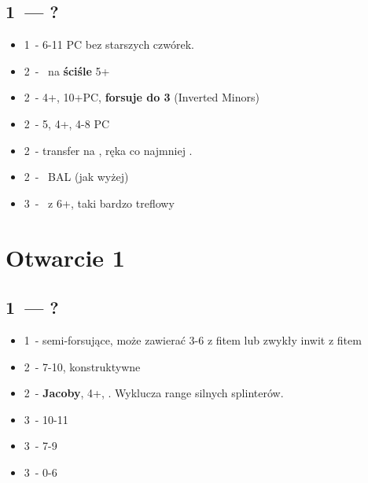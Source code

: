 \documentclass[12pt, a4paper]{article}
\begin{document}
\subsection{1\diams\ --- ?}
\begin{itemize}
    \item 1\nt\ - 6-11 PC bez starszych czwórek.
    \item 2\clubs\ - \gf\ na \textbf{ściśle} 5+\clubs
    \item 2\diams\ - 4+\diams, 10+PC, \textbf{forsuje do 3\diams} (Inverted Minors)
    \item 2\hearts\ - 5\spades, 4+\hearts, 4-8 PC
    \item 2\spades\ - transfer na \nt, ręka co najmniej \inv.
    \item 2\nt\ - \gf\ BAL (jak wyżej)
    \item 3\clubs\ - \inv\ z 6+\clubs, taki bardzo treflowy
\end{itemize}

\pagebreak


\section{Otwarcie 1\major}
\subsection{1\hearts\ --- ?}
\begin{itemize}
    \item 1\nt\ - semi-forsujące, może zawierać 3-6 z fitem lub zwykły inwit z fitem
    \item 2\hearts\ - 7-10, konstruktywne
    \item 2\nt\ - \textbf{Jacoby}, 4+\hearts, \gf. Wyklucza range silnych splinterów.
    \item 3\clubs\ - 10-11
    \item 3\diams\ - 7-9
    \item 3\hearts\ - 0-6
\end{itemize}
\end{document}
